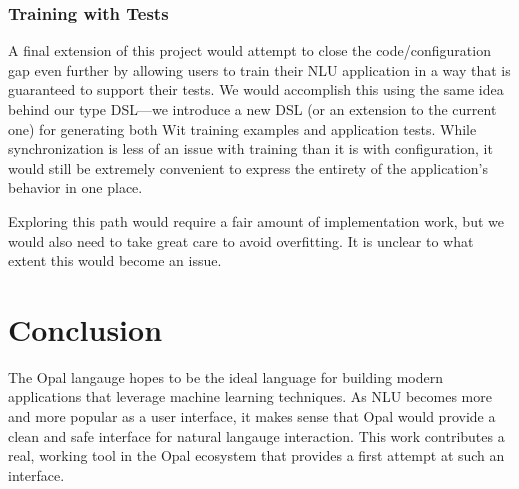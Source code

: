\documentclass[twocolumn]{article}
\begin{document}
\subsubsection{Training with Tests}
A final extension of this project would attempt to close the code/configuration
gap even further by allowing users to train their NLU application in a way that
is guaranteed to support their tests. We would accomplish this using the same
idea behind our type DSL---we introduce a new DSL (or an extension to the
current one) for generating both Wit training examples and application tests.
While synchronization is less of an issue with training than it is with
configuration, it would still be extremely convenient to express the entirety of
the application's behavior in one place.

Exploring this path would require a fair amount of implementation work, but we
would also need to take great care to avoid overfitting. It is unclear to what
extent this would become an issue.

\section{Conclusion} \label{conclusion}
The Opal langauge hopes to be the ideal language for building modern
applications that leverage machine learning techniques. As NLU becomes more and
more popular as a user interface, it makes sense that Opal would provide a clean
and safe interface for natural langauge interaction. This work contributes a
real, working tool in the Opal ecosystem that provides a first attempt at such
an interface.

{}

\end{document}
